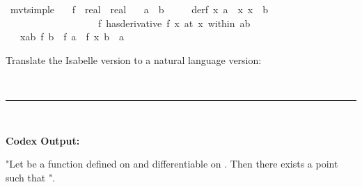 \documentclass{article}
\begin{document}
\begin{boxB}
\begin{isabelle}
\isamarkupfalse \ mvt{\isacharunderscore}{\kern0pt}simple{\isacharcolon}{\kern0pt}\isanewline
\ \ \ f\ {\isacharcolon}{\kern0pt}{\isacharcolon}{\kern0pt}\ {\isachardoublequoteopen}real\ {\isasymRightarrow}\ real{\isachardoublequoteclose}\isanewline
\ \ \ {\isachardoublequoteopen}a\ {\isacharless}{\kern0pt}\ b{\isachardoublequoteclose}\isanewline
\ \ \ \ \ derf{\isacharcolon}{\kern0pt}\ {\isachardoublequoteopen}{\isasymAnd}x{\isachardot}{\kern0pt}\ {\isasymlbrakk}a\ {\isasymle}\ x{\isacharsemicolon}{\kern0pt}\ x\ {\isasymle}\ b{\isasymrbrakk}\ \isanewline
\ \ \ \ \ \ \ \ \ \ \ \ \ \ \ \ \ \ {\isasymLongrightarrow}\ {\isacharparenleft}{\kern0pt}f\ has{\isacharunderscore}{\kern0pt}derivative\ f{\isacharprime}{\kern0pt}\ x{\isacharparenright}{\kern0pt}\ {\isacharparenleft}{\kern0pt}at\ x\ within\ {\isacharbraceleft}{\kern0pt}a{\isachardot}{\kern0pt}{\isachardot}{\kern0pt}b{\isacharbraceright}{\kern0pt}{\isacharparenright}{\kern0pt}{\isachardoublequoteclose}\isanewline
\ \ \ {\isachardoublequoteopen}{\isasymexists}x{\isasymin}{\isacharbraceleft}{\kern0pt}a{\isacharless}{\kern0pt}{\isachardot}{\kern0pt}{\isachardot}{\kern0pt}{\isacharless}{\kern0pt}b{\isacharbraceright}{\kern0pt}{\isachardot}{\kern0pt}\ f\ b\ {\isacharminus}{\kern0pt}\ f\ a\ {\isacharequal}{\kern0pt}\ f{\isacharprime}{\kern0pt}\ x\ {\isacharparenleft}{\kern0pt}b\ {\isacharminus}{\kern0pt}\ a{\isacharparenright}{\kern0pt}{\isachardoublequoteclose}
\end{isabelle}
Translate the Isabelle version to a natural language version:

\
\hrule
\

\textbf{Codex Output:}

"Let  be a function defined on  and differentiable on . Then there exists a point  such that ".
\end{boxB}
\end{document}
